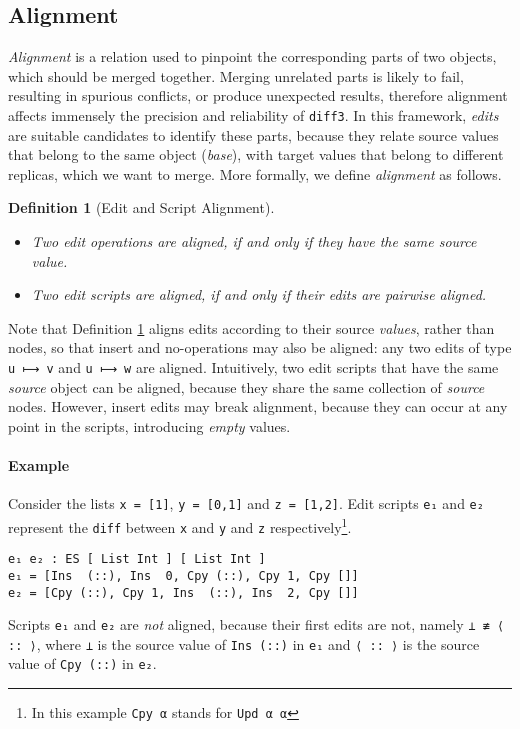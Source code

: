 \documentclass{sigplanconf}
\theoremstyle{plain}
\newtheorem{definition}{Definition}
\begin{document}
\subsection{Alignment}
\label{subsec:alignment}
%
\emph{Alignment} is a relation used to pinpoint the corresponding
parts of two objects, which should be merged together.
%
Merging unrelated parts is likely to fail, resulting in spurious
conflicts, or produce unexpected results, therefore alignment affects
immensely the precision and reliability of \texttt{diff3}.
%
In this framework, \emph{edits} are suitable candidates to identify
these parts, because they relate source values that belong to the same
object (\emph{base}), with target values that belong to different
replicas, which we want to merge.
%
More formally, we define \emph{alignment} as follows.
\begin{definition}[Edit and Script Alignment]
\mbox{}
\label{def:align}
\begin{itemize}
  \item Two edit operations are aligned, if and only if they have the same source value.
  \item Two edit scripts are aligned, if and only if their edits are
    pairwise aligned.
\end{itemize}
\end{definition}
Note that Definition \ref{def:align} aligns edits according to their
source \emph{values}, rather than nodes, so that insert and
no-operations may also be aligned: any two edits of type \texttt{u ⟼
  v} and \texttt{u ⟼ w} are aligned.
%	
Intuitively, two edit scripts that have the same \emph{source} object
can be aligned, because they share the same collection of
\emph{source} nodes.
%
However, insert edits may break alignment, because they can occur at
any point in the scripts, introducing \emph{empty} values.

\paragraph{Example}
Consider the lists \texttt{x = [1]}, \texttt{y = [0,1]} and \texttt{z
  = [1,2]}.
%
Edit scripts \texttt{e₁} and \texttt{e₂} represent the \texttt{diff}
between \texttt{x} and \texttt{y} and \texttt{z}
respectively\footnote{In this example \texttt{Cpy α} stands for \texttt{Upd α α}}.
\begin{verbatim}
e₁ e₂ : ES [ List Int ] [ List Int ]
e₁ = [Ins  (::), Ins  0, Cpy (::), Cpy 1, Cpy []]
e₂ = [Cpy (::), Cpy 1, Ins  (::), Ins  2, Cpy []] 
\end{verbatim}       
%
Scripts \texttt{e₁} and \texttt{e₂} are \emph{not} aligned, because
their first edits are not, namely \texttt{⊥ ≢ ⟨ :: ⟩}, where
\texttt{⊥} is the source value of \texttt{Ins (::)} in \texttt{e₁} and
\texttt{⟨ :: ⟩} is the source value of \texttt{Cpy (::)} in
\texttt{e₂}.
\end{document}
